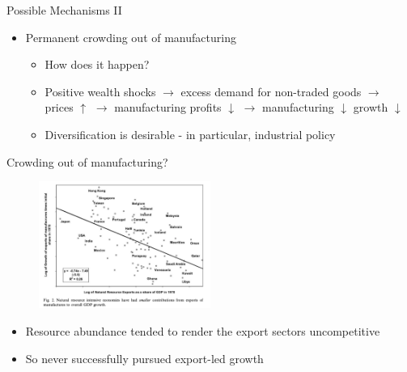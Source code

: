\documentclass[11pt,notes=hide,aspectratio=169,mathserif]{beamer}
\begin{document}
\begin{frame}{Possible Mechanisms II}
\begin{itemize}
\item Permanent crowding out of manufacturing 
\begin{itemize}
    \pause \item How does it happen?
    \pause \item Positive wealth shocks $\rightarrow$ excess demand for non-traded goods $\rightarrow$ prices $\uparrow$ $\rightarrow$ manufacturing profits $\downarrow$ $\rightarrow$ manufacturing $\downarrow$ growth $\downarrow$
    \pause \item Diversification is desirable - in particular, industrial policy 
\end{itemize}
\end{itemize}
\end{frame}

\begin{frame}{Crowding out of manufacturing?}
\begin{figure}
\centering
\includegraphics[width=0.5\textwidth]{../TA9/inputs/fig3.png}
\end{figure}
\begin{itemize}
\item Resource abundance tended to render the export sectors uncompetitive
\item So never successfully pursued export-led growth
\end{itemize}
\end{frame}
\end{document}
